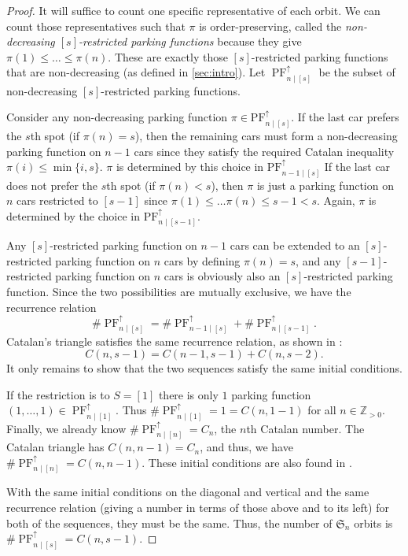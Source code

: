 \documentclass[12 pt]{amsart}
\theoremstyle{definition} %
\theoremstyle{remark} %
\begin{document}
\begin{proof}
	It will suffice to count one specific representative of each orbit. We can count those representatives such that $\pi$ is order-preserving, called the \emph{non-decreasing $[s]$-restricted parking functions} because they give $\pi(1) \le \dots \le \pi(n)$. These are exactly those $[s]$-restricted parking functions that are non-decreasing (as defined in \cref{sec:intro}). Let $\operatorname{PF}_{n \mid [s]}^{\uparrow}$ be the subset of non-decreasing $[s]$-restricted parking functions.

	Consider any non-decreasing parking function $\pi \in \mathrm{PF}_{n \mid [s]}^{\uparrow}$. If the last car prefers the $s$th spot (if $\pi(n) = s$), then the remaining cars must form a non-decreasing parking function on $n - 1$ cars since they satisfy the required Catalan inequality $\pi(i) \le \min \{ i, s \}$. $\pi$ is determined by this choice in $\mathrm{PF}_{n - 1 \mid [s]}^{\uparrow}$ If the last car does not prefer the $s$th spot (if $\pi(n) < s$), then $\pi$ is just a parking function on $n$ cars restricted to $[s - 1]$ since $\pi(1) \le \dots \pi(n) \le s - 1 < s$. Again, $\pi$ is determined by the choice in $\mathrm{PF}_{n \mid [s - 1]}^{\uparrow}$.

	Any $[s]$-restricted parking function on $n - 1$ cars can be extended to an $[s]$-restricted parking function on $n$ cars by defining $\pi(n) = s$, and any $[s - 1]$-restricted parking function on $n$ cars is obviously also an $[s]$-restricted parking function. Since the two possibilities are mutually exclusive, we have the recurrence relation
	\[
		\# \operatorname{PF}_{n \mid [s]}^{\uparrow} = \# \operatorname{PF}_{n - 1 \mid [s]}^{\uparrow} + \# \operatorname{PF}_{n \mid [s - 1]}^{\uparrow} .
	\]
	Catalan's triangle satisfies the same recurrence relation, as shown in \cite{bailey-1996}:
	\[
		C(n, s - 1) = C(n - 1, s - 1) + C(n, s - 2).
	\]
	It only remains to show that the two sequences satisfy the same initial conditions.

	If the restriction is to $S = [1]$ there is only $1$ parking function $(1, \dots, 1) \in \operatorname{PF}_{n \mid [1]}^{\uparrow}$. Thus $\# \operatorname{PF}_{n \mid [1]}^{\uparrow} = 1 = C(n, 1 - 1)$ for all $n \in \mathbb{Z}_{> 0}$. Finally, we already know $\# \operatorname{PF}_{n \mid [n]}^{\uparrow}  = C_{n}$, the $n$th Catalan number. The Catalan triangle has $C(n, n - 1) = C_{n}$, and thus, we have $\# \operatorname{PF}_{n \mid [n]}^{\uparrow} = C(n, n - 1)$. These initial conditions are also found in \cite{bailey-1996}.

	With the same initial conditions on the diagonal and vertical and the same recurrence relation (giving a number in terms of those above and to its left) for both of the sequences, they must be the same. Thus, the number of $\mathfrak S_{n}$ orbits is $\# \operatorname{PF}_{n \mid [s]}^{\uparrow} = C(n, s - 1)$.
\end{proof}
\end{document}
